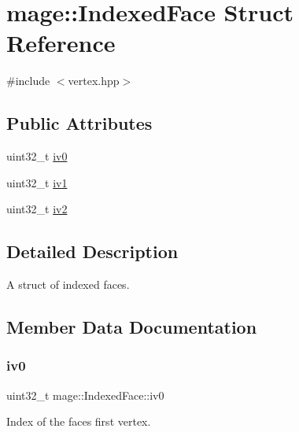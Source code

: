 \hypertarget{structmage_1_1_indexed_face}{}\section{mage\+:\+:Indexed\+Face Struct Reference}
\label{structmage_1_1_indexed_face}


{\ttfamily \#include $<$vertex.\+hpp$>$}

\subsection*{Public Attributes}
\begin{DoxyCompactItemize}
\item 
uint32\+\_\+t \hyperlink{structmage_1_1_indexed_face_aab3b522ac88751c7875b90856888e3ba}{iv0}
\item 
uint32\+\_\+t \hyperlink{structmage_1_1_indexed_face_a35469b3d2baa4c40e3b7db3074842756}{iv1}
\item 
uint32\+\_\+t \hyperlink{structmage_1_1_indexed_face_a343e5f22f65e3721b440cc6cbea50014}{iv2}
\end{DoxyCompactItemize}


\subsection{Detailed Description}
A struct of indexed faces. 

\subsection{Member Data Documentation}
\hypertarget{structmage_1_1_indexed_face_aab3b522ac88751c7875b90856888e3ba}{}\label{structmage_1_1_indexed_face_aab3b522ac88751c7875b90856888e3ba} 
\subsubsection{\texorpdfstring{iv0}{iv0}}
{\footnotesize\ttfamily uint32\+\_\+t mage\+::\+Indexed\+Face\+::iv0}

Index of the face\textquotesingle{}s first vertex. \hypertarget{structmage_1_1_indexed_face_a35469b3d2baa4c40e3b7db3074842756}{}\label{structmage_1_1_indexed_face_a35469b3d2baa4c40e3b7db3074842756} 
